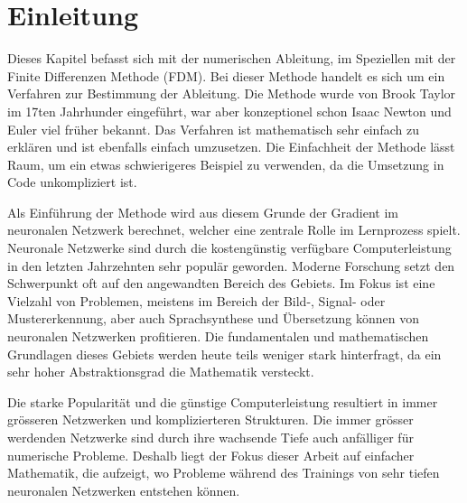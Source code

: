 %
%
%
\section{Einleitung\label{ableitung:section:einleitung}}
Dieses Kapitel befasst sich mit der numerischen Ableitung, im Speziellen mit der Finite Differenzen Methode (FDM).
Bei dieser Methode handelt es sich um ein Verfahren zur Bestimmung der Ableitung.
Die Methode wurde von Brook Taylor im 17ten Jahrhunder eingeführt, war aber konzeptionel schon Isaac Newton und Euler viel früher bekannt. 
Das Verfahren ist mathematisch sehr einfach zu erklären und ist ebenfalls einfach umzusetzen. Die Einfachheit der Methode lässt Raum, um ein etwas schwierigeres Beispiel zu verwenden, da die Umsetzung in Code unkompliziert ist.

Als Einführung der Methode wird aus diesem Grunde der Gradient im neuronalen Netzwerk berechnet, welcher eine zentrale Rolle im Lernprozess spielt.
Neuronale Netzwerke sind durch die kostengünstig verfügbare Computerleistung in den letzten Jahrzehnten sehr populär geworden. Moderne Forschung setzt den Schwerpunkt oft auf den angewandten Bereich des Gebiets. Im Fokus ist eine Vielzahl von Problemen, meistens im Bereich der Bild-, Signal- oder Mustererkennung, aber auch Sprachsynthese und Übersetzung können von neuronalen Netzwerken profitieren. Die fundamentalen und mathematischen Grundlagen dieses Gebiets werden heute teils weniger stark hinterfragt, da ein sehr hoher Abstraktionsgrad die Mathematik versteckt.

Die starke Popularität und die günstige Computerleistung resultiert in immer grösseren Netzwerken und komplizierteren Strukturen. Die immer grösser werdenden Netzwerke sind durch ihre wachsende Tiefe auch anfälliger für numerische Probleme. Deshalb liegt der Fokus dieser Arbeit auf einfacher Mathematik, die aufzeigt, wo Probleme während des Trainings von sehr tiefen neuronalen Netzwerken entstehen können.